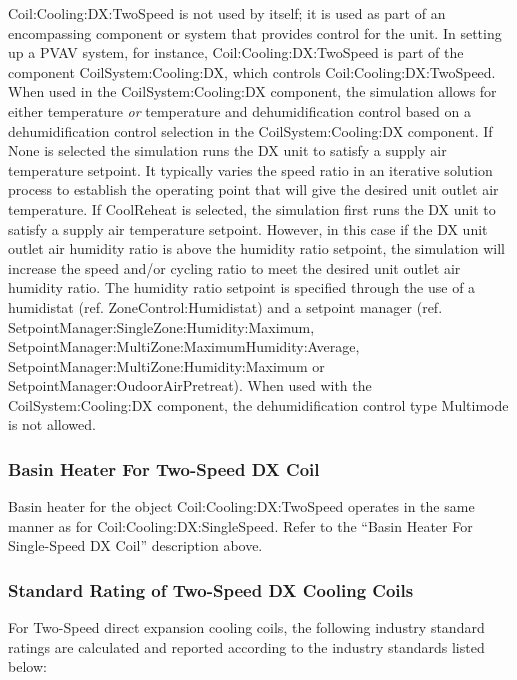 Coil:Cooling:DX:TwoSpeed is not used by itself; it is used as part of an encompassing component or system that provides control for the unit. In setting up a PVAV system, for instance, Coil:Cooling:DX:TwoSpeed is part of the component CoilSystem:Cooling:DX, which controls Coil:Cooling:DX:TwoSpeed. When used in the CoilSystem:Cooling:DX component, the simulation allows for either temperature \emph{or} temperature and dehumidification control based on a dehumidification control selection in the CoilSystem:Cooling:DX component. If None is selected the simulation runs the DX unit to satisfy a supply air temperature setpoint. It typically varies the speed ratio in an iterative solution process to establish the operating point that will give the desired unit outlet air temperature. If CoolReheat is selected, the simulation first runs the DX unit to satisfy a supply air temperature setpoint. However, in this case if the DX unit outlet air humidity ratio is above the humidity ratio setpoint, the simulation will increase the speed and/or cycling ratio to meet the desired unit outlet air humidity ratio. The humidity ratio setpoint is specified through the use of a humidistat (ref. ZoneControl:Humidistat) and a setpoint manager (ref. SetpointManager:SingleZone:Humidity:Maximum, SetpointManager:MultiZone:MaximumHumidity:Average,~ SetpointManager:MultiZone:Humidity:Maximum or SetpointManager:OudoorAirPretreat). When used with the CoilSystem:Cooling:DX component, the dehumidification control type Multimode is not allowed.

\subsubsection{Basin Heater For Two-Speed DX Coil}\label{basin-heater-for-two-speed-dx-coil}

Basin heater for the object Coil:Cooling:DX:TwoSpeed operates in the same manner as for Coil:Cooling:DX:SingleSpeed. Refer to the ``Basin Heater For Single-Speed DX Coil'' description above.

\subsubsection{Standard Rating of Two-Speed DX Cooling Coils}\label{standard-rating-of-two-speed DX Cooling Coils}

For Two-Speed direct expansion cooling coils, the following industry standard ratings are calculated and reported according to the industry standards listed below:

